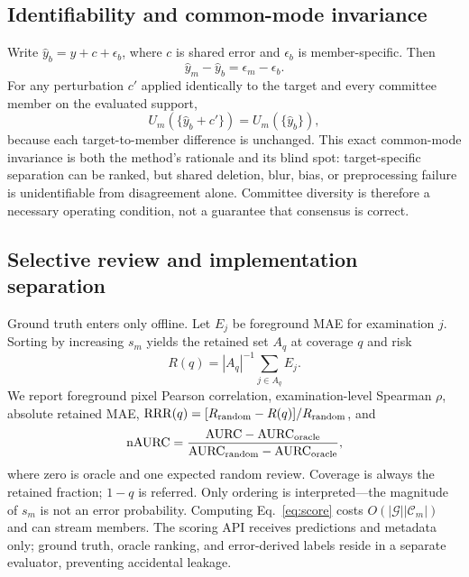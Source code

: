 \documentclass{article}
\begin{document}
\subsection{Identifiability and common-mode invariance}
Write $\hat y_b=y+c+\epsilon_b$, where $c$ is shared error and $\epsilon_b$ is member-specific. Then
\begin{equation}
 \hat y_m-\hat y_b=\epsilon_m-\epsilon_b.
 \label{eq:decomp}
\end{equation}
For any perturbation $c'$ applied identically to the target and every committee member on the evaluated support,
\begin{equation}
 U_m(\{\hat y_b+c'\})=U_m(\{\hat y_b\}),
 \label{eq:invariance}
\end{equation}
because each target-to-member difference is unchanged. This exact common-mode invariance is both the method's rationale and its blind spot: target-specific separation can be ranked, but shared deletion, blur, bias, or preprocessing failure is unidentifiable from disagreement alone. Committee diversity is therefore a necessary operating condition, not a guarantee that consensus is correct.

\subsection{Selective review and implementation separation}
Ground truth enters only offline. Let $E_j$ be foreground MAE for examination $j$. Sorting by increasing $s_m$ yields the retained set $A_q$ at coverage $q$ and risk
\begin{equation}
 R(q)=|A_q|^{-1}\sum_{j\in A_q}E_j.
\end{equation}
We report foreground pixel Pearson correlation, examination-level Spearman $\rho$, absolute retained MAE, $\mathrm{RRR}(q)=[R_{\rm random}-R(q)]/R_{\rm random}$, and
\begin{equation}
 \mathrm{nAURC}=\frac{\mathrm{AURC}-\mathrm{AURC}_{\rm oracle}}
 {\mathrm{AURC}_{\rm random}-\mathrm{AURC}_{\rm oracle}},
 \label{eq:naurc}
\end{equation}
where zero is oracle and one expected random review. Coverage is always the retained fraction; $1-q$ is referred. Only ordering is interpreted---the magnitude of $s_m$ is not an error probability. Computing Eq.~\eqref{eq:score} costs $O(|\mathcal G||\mathcal C_m|)$ and can stream members. The scoring API receives predictions and metadata only; ground truth, oracle ranking, and error-derived labels reside in a separate evaluator, preventing accidental leakage.
\end{document}
